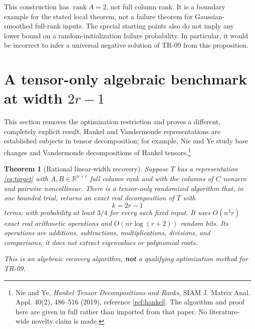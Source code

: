 \documentclass[11pt]{article}
\newtheorem{theorem}{Theorem}[section]
\theoremstyle{remark}\newtheorem{remark}[theorem]{Remark}
\newcommand{\R}{\mathbb R}
\newcommand{\rank}{\operatorname{rank}}
\begin{document}
This construction has $\rank A=2$, not full column rank. It is a boundary example for the stated local theorem, not a failure theorem for Gaussian-smoothed full-rank inputs. The special starting points also do not imply any lower bound on a random-initialization failure probability. In particular, it would be incorrect to infer a universal negative solution of TR-09 from this proposition.

\section{A tensor-only algebraic benchmark at width \texorpdfstring{$2r-1$}{2r-1}}
This section removes the optimization restriction and proves a different, completely explicit result. Hankel and Vandermonde representations are established subjects in tensor decomposition; for example, Nie and Ye study base changes and Vandermonde decompositions of Hankel tensors.\footnote{Nie and Ye, \emph{Hankel Tensor Decompositions and Ranks}, SIAM J. Matrix Anal. Appl. 40(2), 486--516 (2019), reference \ref{ref:hankel}. The algorithm and proof here are given in full rather than imported from that paper. No literature-wide novelty claim is made.}

\begin{theorem}[Rational linear-width recovery]\label{thm:rational}
Suppose $T$ has a representation \eqref{eq:target} with $A,B\in\R^{n\times r}$ full column rank and with the columns of $C$ nonzero and pairwise noncollinear. There is a tensor-only randomized algorithm that, in one bounded trial, returns an exact real decomposition of $T$ with
\[
 k=2r-1
\]
terms, with probability at least $3/4$ for every such fixed input. It uses $O(n^3r)$ exact real arithmetic operations and $O(nr\log(r+2))$ random bits. Its operations are additions, subtractions, multiplications, divisions, and comparisons; it does not extract eigenvalues or polynomial roots.

This is an algebraic recovery algorithm, \textbf{not} a qualifying optimization method for TR-09.
\end{theorem}
\end{document}
